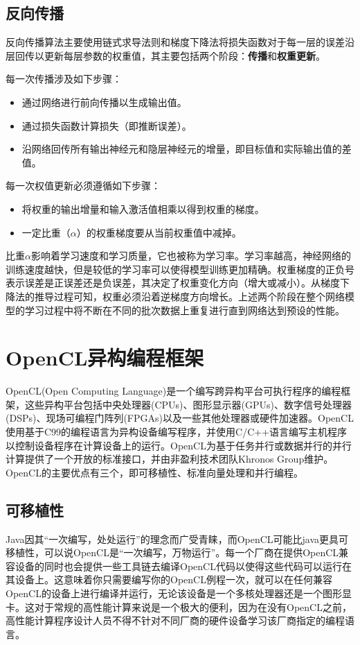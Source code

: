\subsection{反向传播}

反向传播算法主要使用链式求导法则和梯度下降法将损失函数对于每一层的误差沿层回传以更新每层参数的权重值，其主要包括两个阶段：\textbf{传播}和\textbf{权重更新}。

每一次传播涉及如下步骤：

\begin{itemize}
  \item 通过网络进行前向传播以生成输出值。
  \item 通过损失函数计算损失（即推断误差）。
  \item 沿网络回传所有输出神经元和隐层神经元的增量，即目标值和实际输出值的差值。
\end{itemize}

每一次权值更新必须遵循如下步骤：

\begin{itemize}
  \item 将权重的输出增量和输入激活值相乘以得到权重的梯度。
  \item 一定比重（$\alpha$）的权重梯度要从当前权重值中减掉。
\end{itemize}


比重$\alpha$影响着学习速度和学习质量，它也被称为学习率。学习率越高，神经网络的训练速度越快，但是较低的学习率可以使得模型训练更加精确。权重梯度的正负号表示误差是正误差还是负误差，其决定了权重变化方向（增大或减小）。从梯度下降法的推导过程可知，权重必须沿着逆梯度方向增长。上述两个阶段在整个网络模型的学习过程中将不断在不同的批次数据上重复进行直到网络达到预设的性能。

\section{OpenCL异构编程框架}

OpenCL(Open Computing Language)是一个编写跨异构平台可执行程序的编程框架，这些异构平台包括中央处理器(CPUs)、图形显示器(GPUs)、数字信号处理器(DSPs)、现场可编程门阵列(FPGAs)以及一些其他处理器或硬件加速器。OpenCL使用基于C99的编程语言为异构设备编写程序，并使用C/C++语言编写主机程序以控制设备程序在计算设备上的运行。OpenCL为基于任务并行或数据并行的并行计算提供了一个开放的标准接口，并由非盈利技术团队Khronos Group维护。OpenCL的主要优点有三个，即可移植性、标准向量处理和并行编程。

\subsection{可移植性}
Java因其“一次编写，处处运行”的理念而广受青睐，而OpenCL可能比java更具可移植性，可以说OpenCL是“一次编写，万物运行”。每一个厂商在提供OpenCL兼容设备的同时也会提供一些工具链去编译OpenCL代码以使得这些代码可以运行在其设备上。这意味着你只需要编写你的OpenCL例程一次，就可以在任何兼容OpenCL的设备上进行编译并运行，无论该设备是一个多核处理器还是一个图形显卡。这对于常规的高性能计算来说是一个极大的便利，因为在没有OpenCL之前，高性能计算程序设计人员不得不针对不同厂商的硬件设备学习该厂商指定的编程语言。

